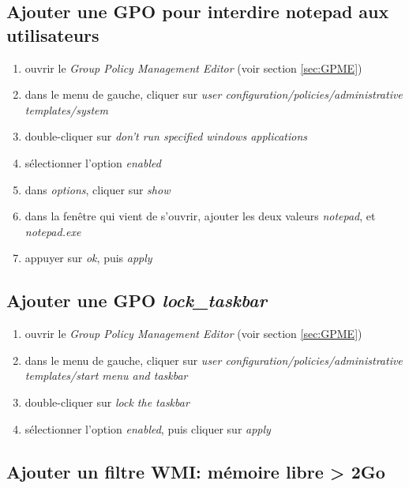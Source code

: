 \documentclass[a4paper]{article}
\begin{document}
\subsection{Ajouter une GPO pour interdire notepad aux utilisateurs}



\begin{enumerate}
    \item ouvrir le \textit{Group Policy Management Editor} (voir section \ref{sec:GPME})
    \item dans le menu de gauche, cliquer sur \textit{user configuration/policies/administrative templates/system}
    \item double-cliquer sur \textit{don't run specified windows applications}
    \item sélectionner l'option \textit{enabled}
    \item dans \textit{options}, cliquer sur \textit{show}
    \item dans la fenêtre qui vient de s'ouvrir, ajouter les deux valeurs \textit{notepad}, et \textit{notepad.exe}
    \item appuyer sur \textit{ok}, puis \textit{apply}
\end{enumerate}





\subsection{Ajouter une GPO \textit{lock\_taskbar}}



\begin{enumerate}
    \item ouvrir le \textit{Group Policy Management Editor} (voir section \ref{sec:GPME})
    \item dans le menu de gauche, cliquer sur \textit{user configuration/policies/administrative templates/start menu and taskbar}
    \item double-cliquer sur \textit{lock the taskbar}
    \item sélectionner l'option \textit{enabled}, puis cliquer sur \textit{apply}
\end{enumerate}





\subsection{Ajouter un filtre WMI: mémoire libre > 2Go}
\end{document}
